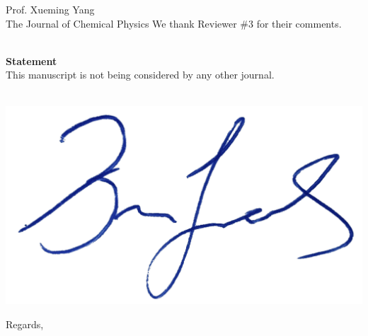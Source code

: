 \documentclass[a4paper,12pt]{letter}
\begin{document}
\begin{sf}
\begin{letter}{%
Prof. Xueming Yang\\
The Journal of Chemical Physics
}
We thank Reviewer \#3 for their comments.


\vspace*{-2ex}\ \\ 
\textbf{Statement}\\[.5ex]
This manuscript is not being considered by any other journal.

\   
\includegraphics[width=.2\textwidth,clip]{signatureXX}
               \closing{Regards,}
\end{letter}
\end{sf}
\end{document}
